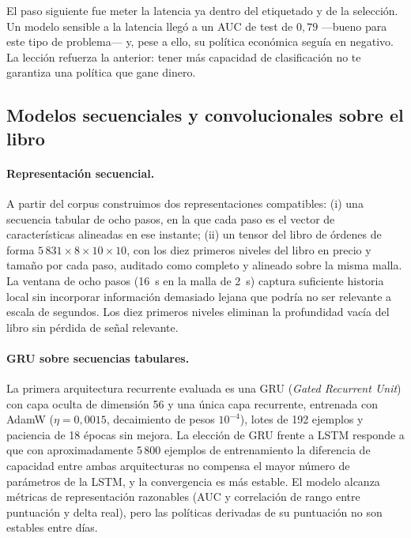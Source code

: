 \documentclass[11pt,a4paper]{article}
\begin{document}
El paso siguiente fue meter la latencia ya dentro del etiquetado y de la selección.
Un modelo sensible a la latencia llegó a un AUC de test de $0{,}79$ ---bueno para
este tipo de problema--- y, pese a ello, su política económica seguía en negativo.
La lección refuerza la anterior: tener más capacidad de clasificación no te
garantiza una política que gane dinero.

\subsection{Modelos secuenciales y convolucionales sobre el libro}

\paragraph{Representación secuencial.}
A partir del corpus construimos dos representaciones compatibles: (i) una
secuencia tabular de ocho pasos, en la que cada paso es el vector de
características alineadas en ese instante; (ii) un tensor del libro de órdenes de
forma $5\,831 \times 8 \times 10 \times 10$, con los diez primeros niveles del
libro en precio y tamaño por cada paso, auditado como completo y alineado sobre la
misma malla. La ventana de ocho pasos (16~s en la malla de 2~s) captura suficiente
historia local sin incorporar información demasiado lejana que podría no ser
relevante a escala de segundos. Los diez primeros niveles eliminan la profundidad
vacía del libro sin pérdida de señal relevante.

\paragraph{GRU sobre secuencias tabulares.}
La primera arquitectura recurrente evaluada es una GRU (\emph{Gated Recurrent
Unit}) con capa oculta de dimensión 56 y una única capa recurrente, entrenada con
AdamW ($\eta = 0{,}0015$, decaimiento de pesos $10^{-4}$), lotes de 192 ejemplos
y paciencia de 18 épocas sin mejora. La elección de GRU frente a LSTM responde a
que con aproximadamente 5\,800 ejemplos de entrenamiento la diferencia de
capacidad entre ambas arquitecturas no compensa el mayor número de parámetros de
la LSTM, y la convergencia es más estable. El modelo alcanza métricas de
representación razonables (AUC y correlación de rango entre puntuación y delta
real), pero las políticas derivadas de su puntuación no son estables entre días.
\end{document}
